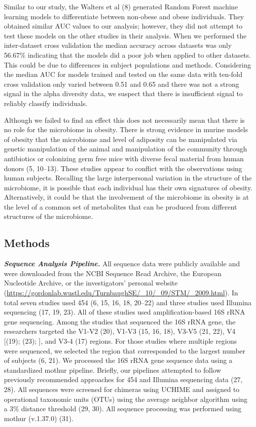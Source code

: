 \documentclass[12pt,]{article}
\begin{document}
Similar to our study, the Walters et al (8) generated Random Forest
machine learning models to differentiate between non-obese and obese
individuals. They obtained similar AUC values to our analysis; however,
they did not attempt to test these models on the other studies in their
analysis. When we performed the inter-dataset cross validation the
median accuracy across datasets was only 56.67\% indicating that the
models did a poor job when applied to other datasets. This could be due
to differences in subject populations and methods. Considering the
median AUC for models trained and tested on the same data with ten-fold
cross validation only varied between 0.51 and 0.65 and there was not a
strong signal in the alpha diversity data, we suspect that there is
insufficient signal to reliably classify individuals.

Although we failed to find an effect this does not necessarily mean that
there is no role for the microbiome in obesity. There is strong evidence
in murine models of obesity that the microbiome and level of adiposity
can be manipulated via genetic manipulation of the animal and
manipulation of the community through antibiotics or colonizing germ
free mice with diverse fecal material from human donors (5, 10--13).
These studies appear to conflict with the observations using human
subjects. Recalling the large interpersonal variation in the structure
of the microbiome, it is possible that each individual has their own
signatures of obesity. Alternatively, it could be that the involvement
of the microbiome in obesity is at the level of a common set of
metabolites that can be produced from different structures of the
microbiome.

\subsection{Methods}\label{methods}

\textbf{\emph{Sequence Analysis Pipeline.}} All sequence data were
publicly available and were downloaded from the NCBI Sequence Read
Archive, the European Nucleotide Archive, or the investigators' personal
website
(\url{https://gordonlab.wustl.edu/TurnbaughSE/_10/_09/STM/_2009.html}).
In total seven studies used 454 (6, 15, 16, 18, 20--22) and three
studies used Illumina sequencing (17, 19, 23). All of these studies used
amplification-based 16S rRNA gene sequencing. Among the studies that
sequenced the 16S rRNA gene, the researchers targeted the V1-V2 (20),
V1-V3 (15, 16, 18), V3-V5 (21, 22), V4 {[}(19); (23); {]}, and V3-4 (17)
regions. For those studies where multiple regions were sequenced, we
selected the region that corresponded to the largest number of subjects
(6, 21). We processed the 16S rRNA gene sequence data using a
standardized mothur pipeline. Briefly, our pipelines attempted to follow
previously recommended approaches for 454 and Illumina sequencing data
(27, 28). All sequences were screened for chimeras using UCHIME and
assigned to operational taxonomic units (OTUs) using the average
neighbor algorithm using a 3\% distance threshold (29, 30). All sequence
processing was performed using mothur (v.1.37.0) (31).
\end{document}
